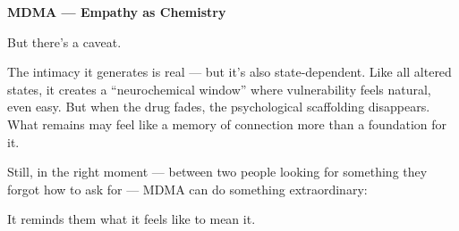 \begin{TechnicalSidebar}{\textbf{MDMA — Empathy as Chemistry}}
  \medskip
  
  But there’s a caveat.

  \medskip
  
  The intimacy it generates is real — but it’s also state-dependent. Like all altered states, it 
  creates a “neurochemical window” where vulnerability feels natural, even easy. But when the drug 
  fades, the psychological scaffolding disappears. What remains may feel like a memory of connection 
  more than a foundation for it.
  
  \medskip
  
  Still, in the right moment — between two people looking for something they forgot how to ask for — 
  MDMA can do something extraordinary:
  
  \medskip
  
  It reminds them what it feels like to mean it.
  
\end{TechnicalSidebar}

